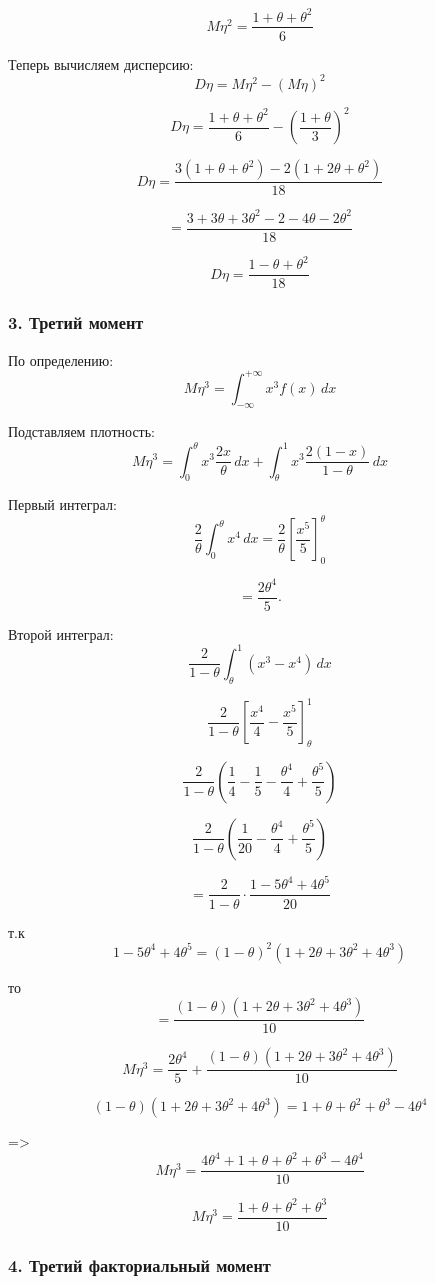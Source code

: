 \documentclass[12pt,a4paper]{article}
\theoremstyle{definition}
\begin{document}
\[\boxed{M\eta^2=\frac{1+\theta+\theta^2}{6}}\]

Теперь вычисляем дисперсию:
\[D\eta=M\eta^2-(M\eta)^2\]

\[D\eta=\frac{1+\theta+\theta^2}{6}
-
\left(\frac{1+\theta}{3}\right)^2\]

\[D\eta=\frac{
3(1+\theta+\theta^2)-2(1+2\theta+\theta^2)
}{18}\]

\[=\frac{3+3\theta+3\theta^2-2-4\theta-2\theta^2
}{18}\]

\[\boxed{D\eta=\frac{1-\theta+\theta^2}{18}}\]

\subsubsection*{3. Третий момент}

По определению:
\[M\eta^3=\int_{-\infty}^{+\infty}x^3f(x)\,dx\]

Подставляем плотность:
\[M\eta^3
=\int_0^\theta
x^3\frac{2x}{\theta}\,dx
+
\int_\theta^1
x^3\frac{2(1-x)}{1-\theta}\,dx\]

Первый интеграл:
\[\frac2\theta\int_0^\theta x^4\,dx
=
\frac2\theta\left[
\frac{x^5}{5}\right]_0^\theta\]

\[=\frac{2\theta^4}{5}.\]

Второй интеграл:
\[\frac2{1-\theta}\int_\theta^1(x^3-x^4)\,dx\]

\[\frac2{1-\theta}\left[
\frac{x^4}{4}-\frac{x^5}{5}\right]_\theta^1\]

\[\frac2{1-\theta}
\left(\frac14-\frac15-\frac{\theta^4}{4}+\frac{\theta^5}{5}
\right)\]

\[\frac2{1-\theta}\left(
\frac1{20}-\frac{\theta^4}{4}+\frac{\theta^5}{5}
\right)\]

\[=
\frac2{1-\theta}\cdot
\frac{1-5\theta^4+4\theta^5}{20}\]

т.к
\[1-5\theta^4+4\theta^5=(1-\theta)^2(1+2\theta+3\theta^2+4\theta^3)\]

то
\[=\frac{(1-\theta)(1+2\theta+3\theta^2+4\theta^3)}{10}\]

\[M\eta^3=\frac{2\theta^4}{5}
+
\frac{(1-\theta)(1+2\theta+3\theta^2+4\theta^3)}{10}\]

\[(1-\theta)(1+2\theta+3\theta^2+4\theta^3)=1+\theta+\theta^2+\theta^3-4\theta^4\]

=>
\[M\eta^3=
\frac{
4\theta^4+1+\theta+\theta^2+\theta^3-4\theta^4
}{10}\]

\[
\boxed{M\eta^3
=
\frac{1+\theta+\theta^2+\theta^3}{10}}\]

\subsubsection*{4. Третий факториальный момент}
\end{document}

